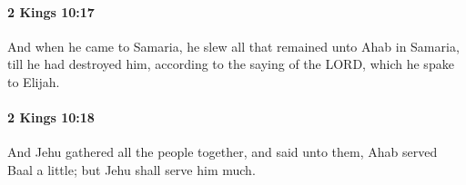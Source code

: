		\paragraph{2 Kings 10:17} %
			\label{2KINGS-10-17}

			And when he came to Samaria, he slew all that remained unto Ahab in Samaria, till he had destroyed him, according to the saying of the LORD, which he spake to Elijah.


		\paragraph{2 Kings 10:18} %
			\label{2KINGS-10-18}

			And Jehu gathered all the people together, and said unto them, Ahab served Baal a little; but Jehu shall serve him much.



